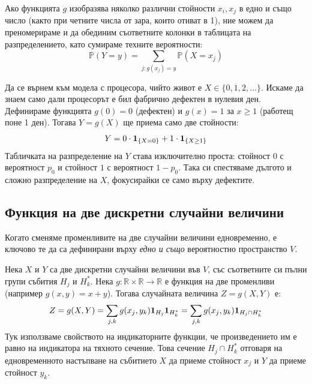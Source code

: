 \begin{lecfigure}
\end{lecfigure}

Ако функцията $g$ изобразява няколко различни стойности $x_i, x_j$ в едно и също число (както при четните числа от зара, които отиват в 1), ние можем да преномерираме и да обединим съответните колонки в таблицата на разпределението, като сумираме техните вероятности:
\[ \mathbb{P}(Y = y) = \sum_{j : g(x_j) = y} \mathbb{P}(X = x_j) \]

\begin{example}\label{ex:04-4}
Да се върнем към модела с процесора, чийто живот е $X \in \{0, 1, 2, \dots\}$. Искаме да знаем само дали процесорът е бил фабрично дефектен в нулевия ден. Дефинираме функцията $g(0) = 0$ (дефектен) и $g(x) = 1$ за $x \ge 1$ (работещ поне 1 ден). Тогава $Y = g(X)$ ще приема само две стойности:
\[ Y = 0 \cdot \mathbf{1}_{\{X=0\}} + 1 \cdot \mathbf{1}_{\{X \ge 1\}} \]
Табличката на разпределение на $Y$ става изключително проста: стойност $0$ с вероятност $p_0$ и стойност $1$ с вероятност $1 - p_0$. Така си спестяваме дългото и сложно разпределение на $X$, фокусирайки се само върху дефектите.

\end{example}

\subsection{Функция на две дискретни случайни величини}
Когато сменяме променливите на две случайни величини едновременно, е ключово те да са дефинирани върху \emph{едно и също} вероятностно пространство $V$.

Нека $X$ и $Y$ са две дискретни случайни величини във $V$, със съответните си пълни групи събития $H_j$ и $H_k^*$. Нека $g: \mathbb{R} \times \mathbb{R} \rightarrow \mathbb{R}$ е функция на две променливи (например $g(x,y) = x+y$). Тогава случайната величина $Z = g(X, Y)$ е:
\[ Z = g(X, Y) = \sum_{j, k} g(x_j, y_k) \mathbf{1}_{H_j} \mathbf{1}_{H_k^*} = \sum_{j, k} g(x_j, y_k) \mathbf{1}_{H_j \cap H_k^*} \]
Тук използваме свойството на индикаторните функции, че произведението им е равно на индикатора на тяхното сечение. Това сечение $H_j \cap H_k^*$ отговаря на едновременното настъпване на събитието $X$ да приеме стойност $x_j$ и $Y$ да приеме стойност $y_k$.

